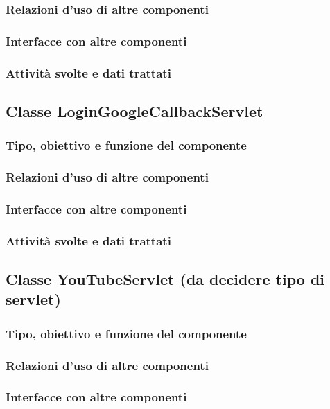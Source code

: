 \subsubsection*{Relazioni d'uso di altre componenti}
\subsubsection*{Interfacce con altre componenti}
\subsubsection*{Attivit\`a svolte e dati trattati}

\subsection{Classe LoginGoogleCallbackServlet}
\subsubsection*{Tipo, obiettivo e funzione del componente}
\subsubsection*{Relazioni d'uso di altre componenti}
\subsubsection*{Interfacce con altre componenti}
\subsubsection*{Attivit\`a svolte e dati trattati}

\subsection{Classe YouTubeServlet (da decidere tipo di servlet)}
\subsubsection*{Tipo, obiettivo e funzione del componente}
\subsubsection*{Relazioni d'uso di altre componenti}
\subsubsection*{Interfacce con altre componenti}
